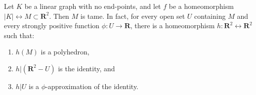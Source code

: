 Let $K$ be a linear graph with no end-points, and let $f$ be a homeomorphism $|K| \leftrightarrow M \subset \mathbf{R}^2$. Then $M$ is tame. In fact, for every open set $U$ containing $M$ and every strongly positive function $\phi: U \to \mathbf{R}$, there is a homeomorphism $h: \mathbf{R}^2 \leftrightarrow \mathbf{R}^2$ such that:
\begin{enumerate}
\item $h(M)$ is a polyhedron,
\item $h | (\mathbf{R}^2 - U)$ is the identity, and
\item $h | U$ is a $\phi$-approximation of the identity.
\end{enumerate}
